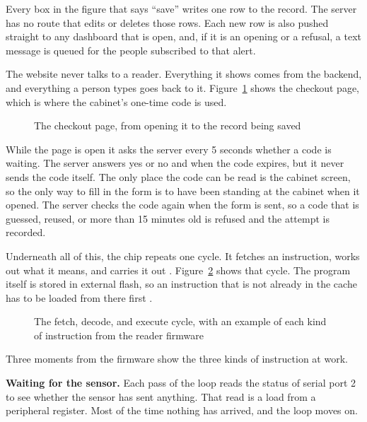 Every box in the figure that says ``save'' writes one row to the record. The
server has no route that edits or deletes those rows. Each new row is also
pushed straight to any dashboard that is open, and, if it is an opening or a
refusal, a text message is queued for the people subscribed to that alert.


The website never talks to a reader. Everything it shows comes from the backend,
and everything a person types goes back to it. Figure~\ref{fig:frontend} shows
the checkout page, which is where the cabinet's one-time code is used.

\begin{figure}[H]
\centering
\caption{The checkout page, from opening it to the record being saved}
\label{fig:frontend}

\end{figure}

While the page is open it asks the server every 5 seconds whether a code is
waiting. The server answers yes or no and when the code expires, but it never
sends the code itself. The only place the code can be read is the cabinet
screen, so the only way to fill in the form is to have been standing at the
cabinet when it opened. The server checks the code again when the form is sent,
so a code that is guessed, reused, or more than 15 minutes old is refused and
the attempt is recorded.


Underneath all of this, the chip repeats one cycle. It fetches an instruction,
works out what it means, and carries it out \parencite{espressif2025}.
Figure~\ref{fig:instruction} shows that cycle. The program itself is stored in
external flash, so an instruction that is not already in the cache has to be
loaded from there first \parencite{espressif2025}.

\begin{figure}[H]
\centering
\caption{The fetch, decode, and execute cycle, with an example of each kind of
instruction from the reader firmware}
\label{fig:instruction}

\end{figure}

Three moments from the firmware show the three kinds of instruction at work.

\textbf{Waiting for the sensor.} Each pass of the loop reads the status of
serial port 2 to see whether the sensor has sent anything. That read is a load
from a peripheral register. Most of the time nothing has arrived, and the loop
moves on.

